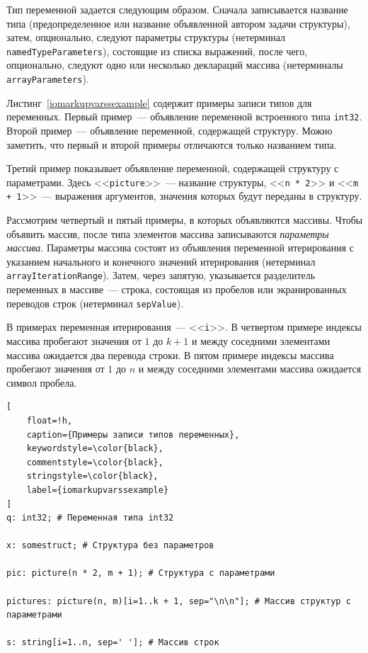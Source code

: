 \documentclass[times,specification,annotation]{style/itmo-student-thesis/itmo-student-thesis}
\begin{document}
Тип переменной задается следующим образом. Сначала записывается название типа (предопределенное или название объявленной автором задачи структуры), затем, опционально, следуют параметры структуры (нетерминал \texttt{namedTypeParameters}), состоящие из списка выражений, после чего, опционально, следуют одно или несколько деклараций массива (нетерминалы \texttt{arrayParameters}).

Листинг~\ref{iomarkupvarssexample} содержит примеры записи типов для переменных. Первый пример~--- объявление переменной встроенного типа \texttt{int32}. Второй пример~--- объявление переменной, содержащей структуру. Можно заметить, что первый и второй примеры отличаются только названием типа.

Третий пример показывает объявление переменной, содержащей структуру с параметрами. Здесь <<\texttt{picture}>>~--- название структуры, <<\texttt{n * 2}>> и <<\texttt{m + 1}>>~--- выражения аргументов, значения которых будут переданы в структуру.

Рассмотрим четвертый и пятый примеры, в которых объявляются массивы. Чтобы объявить массив, после типа элементов массива записываются \textit{параметры массива}. Параметры массива состоят из объявления переменной итерирования с указанием начального и конечного значений итерирования (нетерминал \texttt{arrayIterationRange}). Затем, через запятую, указывается разделитель переменных в массиве~--- строка, состоящая из пробелов или экранированных переводов строк (нетерминал \texttt{sepValue}).

В примерах переменная итерирования~--- <<\texttt{i}>>. В четвертом примере индексы массива пробегают значения от $1$ до $k + 1$ и между соседними элементами массива ожидается два перевода строки. В пятом примере индексы массива пробегают значения от $1$ до $n$ и между соседними элементами массива ожидается символ пробела.

\begin{lstlisting}[
    float=!h,
    caption={Примеры записи типов переменных},
    keywordstyle=\color{black},
    commentstyle=\color{black},
    stringstyle=\color{black},
    label={iomarkupvarssexample}
]
q: int32; # Переменная типа int32

x: somestruct; # Структура без параметров

pic: picture(n * 2, m + 1); # Структура с параметрами

pictures: picture(n, m)[i=1..k + 1, sep="\n\n"]; # Массив структур с параметрами

s: string[i=1..n, sep=' ']; # Массив строк
\end{lstlisting}
\end{document}
